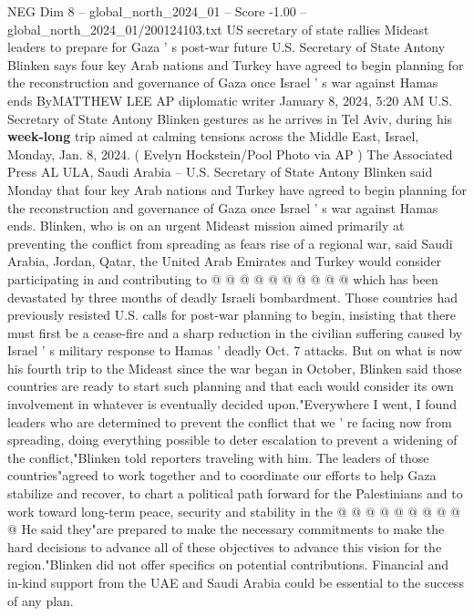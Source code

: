 \begin{textsample}{NEG Dim 8 – global\_north\_2024\_01 – Score -1.00 – global\_north\_2024\_01/200124103.txt}  \label{ex:f8_neg_214}
US secretary of state rallies Mideast leaders to prepare for Gaza ' s post-war future U.S.
Secretary of State Antony Blinken says four key Arab nations and Turkey have agreed to begin planning for the reconstruction and governance of Gaza once Israel ' s war against Hamas ends ByMATTHEW LEE AP diplomatic writer January 8, 2024, 5:20 AM U.S.
Secretary of State Antony Blinken gestures as he arrives in Tel Aviv, during his \textbf{week-long} trip aimed at calming tensions across the Middle East, Israel, Monday, Jan. 8, 2024. ( Evelyn Hockstein/Pool Photo via AP ) The Associated Press AL ULA, Saudi Arabia -- U.S.
Secretary of State Antony Blinken said Monday that four key Arab nations and Turkey have agreed to begin planning for the reconstruction and governance of Gaza once Israel ' s war against Hamas ends.
Blinken, who is on an urgent Mideast mission aimed primarily at preventing the conflict from spreading as fears rise of a regional war, said Saudi Arabia, Jordan, Qatar, the United Arab Emirates and Turkey would consider participating in and contributing to @ @ @ @ @ @ @ @ @ @ which has been devastated by three months of deadly Israeli bombardment.
Those countries had previously resisted U.S. calls for post-war planning to begin, insisting that there must first be a cease-fire and a sharp reduction in the civilian suffering caused by Israel ' s military response to Hamas ' deadly Oct. 7 attacks.
But on what is now his fourth trip to the Mideast since the war began in October, Blinken said those countries are ready to start such planning and that each would consider its own involvement in whatever is eventually decided upon."Everywhere I went, I found leaders who are determined to prevent the conflict that we ' re facing now from spreading, doing everything possible to deter escalation to prevent a widening of the conflict,"Blinken told reporters traveling with him.
The leaders of those countries"agreed to work together and to coordinate our efforts to help Gaza stabilize and recover, to chart a political path forward for the Palestinians and to work toward long-term peace, security and stability in the @ @ @ @ @ @ @ @ @ @ He said they"are prepared to make the necessary commitments to make the hard decisions to advance all of these objectives to advance this vision for the region."Blinken did not offer specifics on potential contributions.
Financial and in-kind support from the UAE and Saudi Arabia could be essential to the success of any plan.

\end{textsample}
